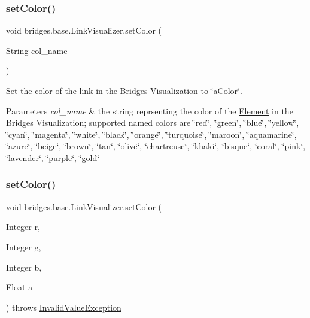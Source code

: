 \subsubsection{\texorpdfstring{set\+Color()}{setColor()}\hspace{0.1cm}{\footnotesize\ttfamily [1/2]}}
{\footnotesize\ttfamily void bridges.\+base.\+Link\+Visualizer.\+set\+Color (\begin{DoxyParamCaption}\item[{String}]{col\+\_\+name }\end{DoxyParamCaption})}

Set the color of the link in the Bridges Visualization to \char`\"{}a\+Color\char`\"{}.


\begin{DoxyParams}{Parameters}
{\em col\+\_\+name} & the string reprsenting the color of the \mbox{\hyperlink{classbridges_1_1base_1_1_element}{Element}} in the Bridges Visualization; supported named colors are \char`\"{}red\char`\"{}, \char`\"{}green\char`\"{}, \char`\"{}blue\char`\"{}, \char`\"{}yellow\char`\"{}, \char`\"{}cyan\char`\"{}, \char`\"{}magenta\char`\"{}, \char`\"{}white\char`\"{}, \char`\"{}black\char`\"{}, \char`\"{}orange\char`\"{}, \char`\"{}turquoise\char`\"{}, \char`\"{}maroon\char`\"{}, \char`\"{}aquamarine\char`\"{}, \char`\"{}azure\char`\"{}, \char`\"{}beige\char`\"{}, \char`\"{}brown\char`\"{}, \char`\"{}tan\char`\"{}, \char`\"{}olive\char`\"{}, \char`\"{}chartreuse\char`\"{}, \char`\"{}khaki\char`\"{}, \char`\"{}bisque\char`\"{}, \char`\"{}coral\char`\"{}, \char`\"{}pink\char`\"{}, \char`\"{}lavender\char`\"{}, \char`\"{}purple\char`\"{}, \char`\"{}gold\char`\"{} \\
\hline
\end{DoxyParams}
\mbox{\label{classbridges_1_1base_1_1_link_visualizer_a003905cfe33e1704555b2b3a1cf99bad}} 
\subsubsection{\texorpdfstring{set\+Color()}{setColor()}\hspace{0.1cm}{\footnotesize\ttfamily [2/2]}}
{\footnotesize\ttfamily void bridges.\+base.\+Link\+Visualizer.\+set\+Color (\begin{DoxyParamCaption}\item[{Integer}]{r,  }\item[{Integer}]{g,  }\item[{Integer}]{b,  }\item[{Float}]{a }\end{DoxyParamCaption}) throws \mbox{\hyperlink{classbridges_1_1validation_1_1_invalid_value_exception}{Invalid\+Value\+Exception}}}

